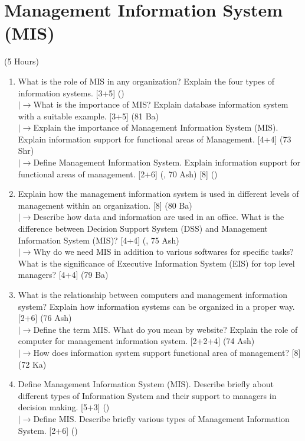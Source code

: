 \documentclass[12pt]{article}
\newcommand{\lb}{\\$\left|\rightarrow\right.$}
\begin{document}
\section{Management Information System (MIS)}
\begin{center}(5 Hours)\end{center}
    \begin{enumerate}[topsep=0pt, noitemsep]
      \item What is the role of MIS in any organization? Explain the four types of information systems. \hfill [3+5] ()
        \lb What is the importance of MIS? Explain database information system with a suitable example. \hfill [3+5] (81 Ba)
        \lb Explain the importance of Management Information System (MIS). Explain information support for functional areas of Management. \hfill [4+4] (73 Shr)
        \lb Define Management Information System. Explain information support for functional areas of management. \hfill [2+6] (, 70 Ash) [8] ()

      \item Explain how the management information system is used in different levels of management within an organization. \hfill [8] (80 Ba)
        \lb Describe how data and information are used in an office. What is the difference between Decision Support System (DSS) and Management Information System (MIS)? \hfill [4+4] (, 75 Ash)
        \lb Why do we need MIS in addition to various softwares for specific tasks? What is the significance of Executive Information System (EIS) for top level managers? \hfill [4+4] (79 Ba)

      \item What is the relationship between computers and management information system? Explain how information systems can be organized in a proper way. \hfill [2+6] (76 Ash)
        \lb Define the term MIS. What do you mean by website? Explain the role of computer for management information system. \hfill [2+2+4] (74 Ash)
        \lb How does information system support functional area of management? \hfill [8] (72 Ka)

      \item Define Management Information System (MIS). Describe briefly about different types of Information System and their support to managers in decision making. \hfill [5+3] ()
        \lb Define MIS. Describe briefly various types of Management Information System. \hfill [2+6] ()
    \end{enumerate}
\end{document}
